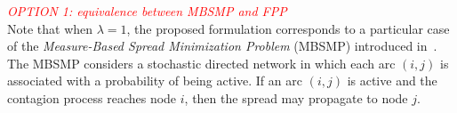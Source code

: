 \documentclass[a4paper,fleqn]{cas-sc}
\begin{document}

\textcolor{red}{\emph{OPTION 1: equivalence between MBSMP and FPP}}\\
Note that when $\lambda = 1$, the proposed formulation corresponds to a particular case of the 
\textit{Measure-Based Spread Minimization Problem} (MBSMP) introduced in~\citep{taninmics2024benders}. 
The MBSMP considers a stochastic directed network in which each arc $(i,j)$ is associated with a probability of being active. 
If an arc $(i,j)$ is active and the contagion process reaches node $i$, then the spread may propagate to node $j$.
\end{document}

